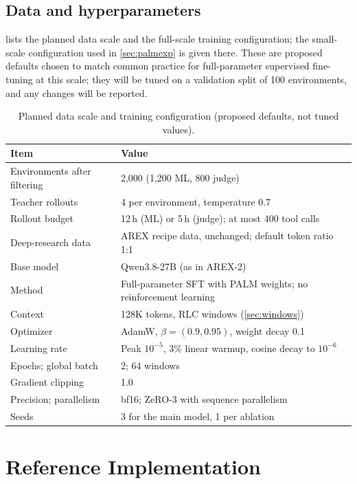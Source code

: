 \documentclass[11pt]{article}
\begin{document}
\subsection{Data and hyperparameters}
\label{sec:hparams}
 lists the planned data scale and the full-scale training configuration; the small-scale configuration used in \cref{sec:palmexp} is given there. These are proposed defaults chosen to match common practice for full-parameter supervised fine-tuning at this scale; they will be tuned on a validation split of 100 environments, and any changes will be reported.

\begin{table}[t]
\centering
\small
\caption{Planned data scale and training configuration (proposed defaults, not tuned values).}
\label{tab:hparams}
\begin{tabularx}{\linewidth}{@{}l Y@{}}
\toprule
Item & Value \\
\midrule
Environments after filtering & 2{,}000 (1{,}200 ML, 800 judge) \\
Teacher rollouts & 4 per environment, temperature 0.7 \\
Rollout budget & 12\,h (ML) or 5\,h (judge); at most 400 tool calls \\
Deep-research data & AREX recipe data, unchanged; default token ratio 1:1 \\
\midrule
Base model & Qwen3.8-27B (as in AREX-2) \\
Method & Full-parameter SFT with PALM weights; no reinforcement learning \\
Context & 128K tokens, RLC windows (\cref{sec:windows}) \\
Optimizer & AdamW, $\beta = (0.9, 0.95)$, weight decay 0.1 \\
Learning rate & Peak $10^{-5}$, 3\% linear warmup, cosine decay to $10^{-6}$ \\
Epochs; global batch & 2; 64 windows \\
Gradient clipping & 1.0 \\
Precision; parallelism & bf16; ZeRO-3 with sequence parallelism \\
Seeds & 3 for the main model, 1 per ablation \\
\bottomrule
\end{tabularx}
\end{table}

\section{Reference Implementation}
\label{sec:impl}
\end{document}

